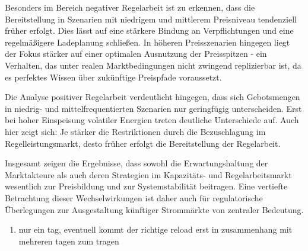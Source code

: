 Besonders im Bereich negativer Regelarbeit  ist zu erkennen, dass die Bereitstellung in Szenarien mit niedrigem und mittlerem Preisniveau
tendenziell früher erfolgt.  Dies lässt auf eine stärkere Bindung an Verpflichtungen und eine regelmäßigere Ladeplanung schließen.
In höheren Preisszenarien hingegen liegt der Fokus stärker auf einer optimalen Ausnutzung der Preisspitzen - ein Verhalten, das unter realen Marktbedingungen
nicht zwingend replizierbar ist, da es perfektes Wissen über zukünftige Preispfade voraussetzt.

Die Analyse positiver Regelarbeit verdeutlicht hingegen, dass sich Gebotsmengen in niedrig- und mittelfrequentierten Szenarien
nur geringfügig unterscheiden. Erst bei hoher Einspeisung volatiler Energien treten deutliche Unterschiede auf. Auch hier zeigt
sich: Je stärker die Restriktionen durch die Bezuschlagung im Regelleistungsmarkt, desto früher erfolgt die Bereitstellung der Regelarbeit.

Insgesamt zeigen die Ergebnisse, dass sowohl die Erwartungshaltung der Marktakteure als auch deren Strategien im Kapazitäts-
und Regelarbeitsmarkt wesentlich zur Preisbildung und zur Systemstabilität beitragen. Eine vertiefte Betrachtung
dieser Wechselwirkungen ist daher auch für regulatorische Überlegungen zur Ausgestaltung künftiger Strommärkte von zentraler Bedeutung.

\begin{enumerate}
	\item nur ein tag, eventuell kommt der richtige reload erst in zusammenhang mit mehreren tagen zum tragen
\end{enumerate}
